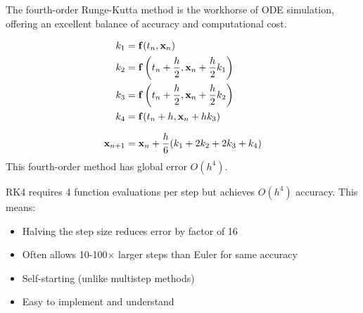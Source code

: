 The fourth-order Runge-Kutta method is the workhorse of ODE simulation, offering an excellent balance of accuracy and computational cost.

\begin{definitionbox}[title=Definition 11.12: Classical RK4 Method]
\begin{align}
k_1 &= \mathbf{f}(t_n, \mathbf{x}_n) \\
k_2 &= \mathbf{f}\left(t_n + \frac{h}{2}, \mathbf{x}_n + \frac{h}{2}k_1\right) \\
k_3 &= \mathbf{f}\left(t_n + \frac{h}{2}, \mathbf{x}_n + \frac{h}{2}k_2\right) \\
k_4 &= \mathbf{f}(t_n + h, \mathbf{x}_n + hk_3) \\[6pt]
\mathbf{x}_{n+1} &= \mathbf{x}_n + \frac{h}{6}(k_1 + 2k_2 + 2k_3 + k_4)
\end{align}
This fourth-order method has global error $O(h^4)$.
\end{definitionbox}

\begin{keyconceptbox}[title=Why RK4 is Popular]
RK4 requires 4 function evaluations per step but achieves $O(h^4)$ accuracy. This means:
\begin{itemize}
    \item Halving the step size reduces error by factor of 16
    \item Often allows 10-100$\times$ larger steps than Euler for same accuracy
    \item Self-starting (unlike multistep methods)
    \item Easy to implement and understand
\end{itemize}
\end{keyconceptbox}

